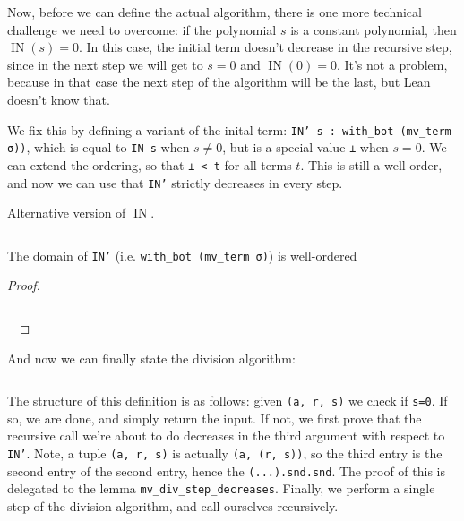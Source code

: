 \documentclass[a4paper, 12pt]{article}
\DeclareMathOperator{\IN}{IN}
\newcommand{\lean}[1]{\texttt{#1}}
\theoremstyle{changedot}
\theoremstyle{changedotbreak}
\theoremstyle{nonumberplain}
\newtheorem{proof}{Proof}
\begin{document}
\inputminted[firstline=22, lastline=23]{lean}{../src/mv_division.lean}

Now, before we can define the actual algorithm, there is one more technical challenge we need to overcome: if the polynomial $s$ is a constant polynomial, then $\IN(s) = 0$. In this case, the initial term doesn't decrease in the recursive step, since in the next step we will get to $s = 0$ and $\IN(0) = 0$. It's not a problem, because in that case the next step of the algorithm will be the last, but Lean doesn't know that.

We fix this by defining a variant of the inital term: \lean{IN' s : with_bot (mv_term σ))}, which is equal to \lean{IN s} when $s \ne 0$, but is a special value \lean{⊥} when $s = 0$. We can extend the ordering, so that \lean{⊥ < t} for all terms $t$. This is still a well-order, and now we can use that \lean{IN'} strictly decreases in every step.

\begin{definition} Alternative version of $\IN$.

  \inputminted[firstline=26, lastline=30]{lean}{../src/initial_term.lean}
\end{definition}

\begin{lemma} The domain of \lean{IN'} (i.e. \lean{with_bot (mv_term σ)}) is well-ordered
\end{lemma}
\begin{proof}
  ~
  \inputminted[firstline=104, lastline=107]{lean}{../src/monomial_order.lean}
  ~
\end{proof}

And now we can finally state the division algorithm:

\inputminted[firstline=313, lastline=332]{lean}{../src/mv_division.lean}

The structure of this definition is as follows: given \lean{(a, r, s)} we check if \lean{s=0}. If so, we are done, and simply return the input. If not, we first prove that the recursive call we're about to do decreases in the third argument with respect to \lean{IN'}. Note, a tuple \lean{(a, r, s)} is actually \lean{(a, (r, s))}, so the third entry is the second entry of the second entry, hence the \lean{(...).snd.snd}. The proof of this is delegated to the lemma \lean{mv_div_step_decreases}. Finally, we perform a single step of the division algorithm, and call ourselves recursively.
\end{document}
